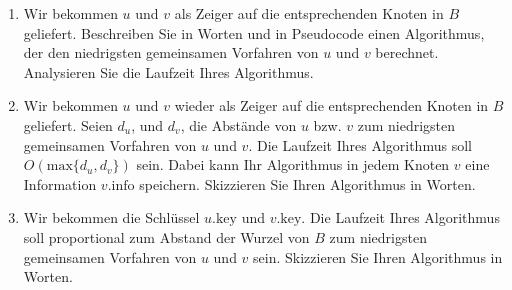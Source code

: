 \documentclass{bschlangaul-aufgabe}
\begin{document}
\begin{enumerate}


\item Wir bekommen $u$ und $v$ als Zeiger auf die entsprechenden Knoten
in $B$ geliefert. Beschreiben Sie in Worten und in Pseudocode einen
Algorithmus, der den niedrigsten gemeinsamen Vorfahren von $u$ und $v$
berechnet. Analysieren Sie die Laufzeit Ihres Algorithmus.



\item Wir bekommen $u$ und $v$ wieder als Zeiger auf die entsprechenden
Knoten in $B$ geliefert. Seien $d_u$, und $d_v$, die Abstände von $u$
bzw. $v$ zum niedrigsten gemeinsamen Vorfahren von $u$ und $v$. Die
Laufzeit Ihres Algorithmus soll $O(\text{max}\{d_u, d_v\})$ sein. Dabei
kann Ihr Algorithmus in jedem Knoten $v$ eine Information
$v.\text{info}$ speichern. Skizzieren Sie Ihren Algorithmus in Worten.


\item Wir bekommen die Schlüssel $u.\text{key}$ und $v.\text{key}$. Die
Laufzeit Ihres Algorithmus soll proportional zum Abstand der Wurzel von
$B$ zum niedrigsten gemeinsamen Vorfahren von $u$ und $v$ sein.
Skizzieren Sie Ihren Algorithmus in Worten.
\end{enumerate}
\end{document}
